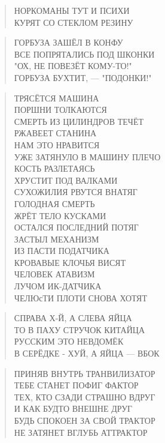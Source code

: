 \poemtitle{***}
\begin{verse}
НОРКОМАНЫ ТУТ И ПСИХИ\\
КУРЯТ СО СТЕКЛОМ РЕЗИНУ
\end{verse}

\poemtitle{***}
\begin{verse}
ГОРБУЗА ЗАШЁЛ В КОНФУ\\
ВСЕ ПОПРЯТАЛИСЬ ПОД ШКОНКИ\\
"ОХ, НЕ ПОВЕЗЁТ КОМУ-ТО!"\\
ГОРБУЗА БУХТИТ, — "ПОДОНКИ!"
\end{verse}

\poemtitle{***}
\begin{verse}
ТРЯСЁТСЯ МАШИНА\\
ПОРШНИ ТОЛКАЮТСЯ\\
СМЕРТЬ ИЗ ЦИЛИНДРОВ ТЕЧЁТ\\
РЖАВЕЕТ СТАНИНА\\
НАМ ЭТО НРАВИТСЯ\\
УЖЕ ЗАТЯНУЛО В МАШИНУ ПЛЕЧО\\
КОСТЬ РАЗЛЕТАЯСЬ\\
ХРУСТИТ ПОД ВАЛКАМИ\\
СУХОЖИЛИЯ РВУТСЯ ВНАТЯГ\\
ГОЛОДНАЯ СМЕРТЬ\\
ЖРЁТ ТЕЛО КУСКАМИ\\
ОСТАЛСЯ ПОСЛЕДНИЙ ПОТЯГ\\
ЗАСТЫЛ МЕХАНИЗМ\\
ИЗ ПАСТИ ПОДАТЧИКА\\
КРОВАВЫЕ КЛОЧЬЯ ВИСЯТ\\
ЧЕЛОВЕК АТАВИЗМ\\
ЛУЧОМ ИК-ДАТЧИКА\\
ЧЕЛЮсТИ ПЛОТИ СНОВА ХОТЯТ
\end{verse}

\poemtitle{***}
\begin{verse}
СПРАВА Х-Й, А СЛЕВА ЯЙЦА\\
ТО В ПАХУ СТРУЧОК КИТАЙЦА\\
РУССКИМ ЭТО НЕВДОМЁК\\
В СЕРЁДКЕ - ХУЙ, А ЯЙЦА — ВБОК
\end{verse}

\poemtitle{***}
\begin{verse}
ПРИНЯВ ВНУТРЬ ТРАНВИЛИЗАТОР\\
ТЕБЕ СТАНЕТ ПОФИГ ФАКТОР\\
ТЕХ, КТО СЗАДИ СТРАШНО ВДРУГ\\
И КАК БУДТО ВНЕШНЕ ДРУГ\\
БУДЬ СПОКОЕН ЗА СВОЙ ТРАКТОР\\
НЕ ЗАТЯНЕТ ВГЛУБЬ АТТРАКТОР
\end{verse}

